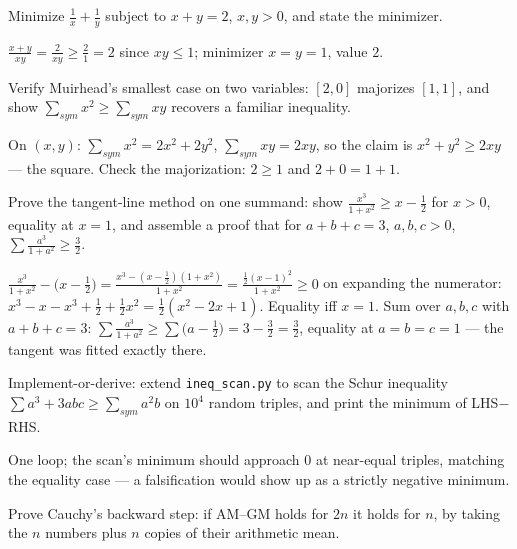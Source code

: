 \begin{exercise}[medium]\label{exr:a7}
Minimize $\frac1x+\frac1y$ subject to $x+y=2$, $x,y>0$, and state the
minimizer.
\end{exercise}
\begin{solution}
$\frac{x+y}{xy}=\frac2{xy}\ge\frac2{1}=2$ since $xy\le1$; minimizer
$x=y=1$, value $2$.
\end{solution}
\begin{exercise}[medium]\label{exr:a8}
Verify Muirhead's smallest case on two variables: $[2,0]$ majorizes
$[1,1]$, and show $\sum_{sym}x^2 \ge \sum_{sym}xy$ recovers a familiar
inequality.
\end{exercise}
\begin{solution}
On $(x,y)$: $\sum_{sym}x^2 = 2x^2+2y^2$, $\sum_{sym}xy = 2xy$, so the
claim is $x^2+y^2\ge2xy$ --- the square. Check the majorization:
$2\ge1$ and $2+0=1+1$.
\end{solution}
\begin{exercise}[hard]\label{exr:a9}
Prove the tangent-line method on one summand: show
$\frac{x^3}{1+x^2}\ge x-\frac12$ for $x>0$, equality at $x=1$, and
assemble a proof that for $a+b+c=3$, $a,b,c>0$,
$\sum \frac{a^3}{1+a^2}\ge\frac32$.
\end{exercise}
\begin{solution}
$\frac{x^3}{1+x^2} - \bigl(x-\frac12\bigr) =
\frac{x^3 - (x-\frac12)(1+x^2)}{1+x^2} =
\frac{\frac12(x-1)^2}{1+x^2} \ge 0$ on expanding the numerator:
$x^3 - x - x^3 + \frac12 + \frac12x^2 = \frac12(x^2-2x+1)$. Equality iff
$x=1$. Sum over $a,b,c$ with $a+b+c=3$:
$\sum \frac{a^3}{1+a^2} \ge \sum\bigl(a-\frac12\bigr) = 3-\frac32 =
\frac32$, equality at $a=b=c=1$ --- the tangent was fitted exactly
there.
\end{solution}
\begin{exercise}[hard]\label{exr:a10}
Implement-or-derive: extend \texttt{ineq\_scan.py} to scan the
Schur inequality $\sum a^3+3abc\ge\sum_{sym}a^2b$ on $10^4$ random
triples, and print the minimum of LHS$-$RHS.
\end{exercise}
\begin{solution}
One loop; the scan's minimum should approach $0$ at near-equal triples,
matching the equality case --- a falsification would show up as a
strictly negative minimum.
\end{solution}
\begin{exercise}[hard]\label{exr:a11}
Prove Cauchy's backward step: if AM--GM holds for $2n$ it holds for
$n$, by taking the $n$ numbers plus $n$ copies of their arithmetic mean.
\end{exercise}
